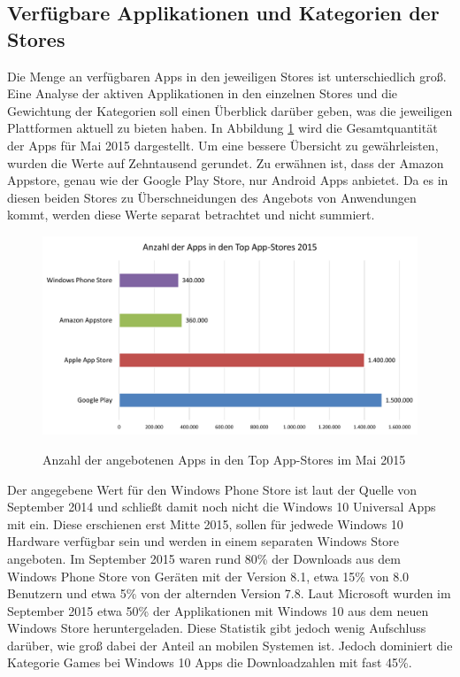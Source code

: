\subsection{Verfügbare Applikationen und Kategorien der Stores}
Die Menge an verfügbaren Apps in den jeweiligen Stores ist unterschiedlich groß.
Eine Analyse der aktiven Applikationen in den einzelnen Stores und die Gewichtung der Kategorien soll einen Überblick darüber geben, was die jeweiligen Plattformen aktuell zu bieten haben.
In Abbildung \ref{graph_apps_in_stores} wird die Gesamtquantität der Apps für Mai 2015 dargestellt. Um eine bessere Übersicht zu gewährleisten, wurden die Werte auf Zehntausend gerundet. Zu erwähnen ist, dass der Amazon Appstore, genau wie der Google Play Store, nur Android Apps anbietet. Da es in diesen beiden Stores zu Überschneidungen des Angebots von Anwendungen kommt, werden diese Werte separat betrachtet und nicht summiert.

\begin{figure}[htbp]
	\centering
	\includegraphics[width=1\textwidth]{Bilder/Anzahl_der_Apps}
	\caption{Anzahl der angebotenen Apps in den Top App-Stores im Mai 2015}\label{graph_apps_in_stores}\citep{apps_in_stores}
\end{figure}

Der angegebene Wert für den Windows Phone Store ist laut der Quelle von September 2014 und schließt damit noch nicht die Windows 10 Universal Apps mit ein. Diese erschienen erst Mitte 2015, sollen für jedwede Windows 10 Hardware verfügbar sein und werden in einem separaten Windows Store angeboten. Im September 2015 waren rund 80\% der Downloads aus dem Windows Phone Store von Geräten mit der Version 8.1, etwa 15\% von 8.0 Benutzern und etwa 5\% von der alternden Version 7.8.
Laut Microsoft wurden im September 2015 etwa 50\% der Applikationen mit Windows 10 aus dem neuen Windows Store heruntergeladen. Diese Statistik gibt jedoch wenig Aufschluss darüber, wie groß dabei der Anteil an mobilen Systemen ist. Jedoch dominiert die Kategorie Games bei Windows 10 Apps die Downloadzahlen mit fast 45\%.\citep{windows_store_trends_2015}

